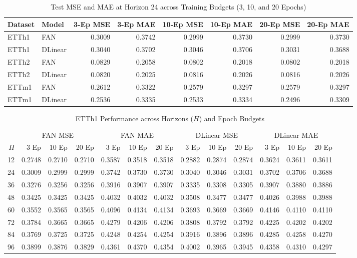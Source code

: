 \begin{table}[t]
\caption{Test MSE and MAE at Horizon 24 across Training Budgets (3, 10, and 20 Epochs)}
\label{tab:extension_h24}
\centering
\footnotesize
\begin{tabular}{@{}llrrrrrr@{}}
\toprule
Dataset & Model & 3-Ep MSE & 3-Ep MAE & 10-Ep MSE & 10-Ep MAE & 20-Ep MSE & 20-Ep MAE\\
\midrule
ETTh1 & FAN & 0.3009 & 0.3742 & 0.2999 & 0.3730 & 0.2999 & 0.3730\\
ETTh1 & DLinear & 0.3040 & 0.3702 & 0.3046 & 0.3706 & 0.3031 & 0.3688\\
\midrule
ETTh2 & FAN & 0.0829 & 0.2058 & 0.0802 & 0.2018 & 0.0802 & 0.2018\\
ETTh2 & DLinear & 0.0820 & 0.2025 & 0.0816 & 0.2026 & 0.0816 & 0.2026\\
\midrule
ETTm1 & FAN & 0.2612 & 0.3322 & 0.2579 & 0.3297 & 0.2579 & 0.3297\\
ETTm1 & DLinear & 0.2536 & 0.3335 & 0.2533 & 0.3334 & 0.2496 & 0.3309\\
\midrule
\bottomrule
\end{tabular}
\end{table}

\begin{table}[t]
\caption{ETTh1 Performance across Horizons ($H$) and Epoch Budgets}
\label{tab:extension_etth1}
\centering
\scriptsize
\begin{tabular}{@{}r|rrr|rrr|rrr|rrr@{}}
\toprule
 & \multicolumn{3}{c|}{FAN MSE} & \multicolumn{3}{c|}{FAN MAE} & \multicolumn{3}{c|}{DLinear MSE} & \multicolumn{3}{c}{DLinear MAE}\\
$H$ & 3 Ep & 10 Ep & 20 Ep & 3 Ep & 10 Ep & 20 Ep & 3 Ep & 10 Ep & 20 Ep & 3 Ep & 10 Ep & 20 Ep\\
\midrule
12 & 0.2748 & 0.2710 & 0.2710 & 0.3587 & 0.3518 & 0.3518 & 0.2882 & 0.2874 & 0.2874 & 0.3624 & 0.3611 & 0.3611\\
24 & 0.3009 & 0.2999 & 0.2999 & 0.3742 & 0.3730 & 0.3730 & 0.3040 & 0.3046 & 0.3031 & 0.3702 & 0.3706 & 0.3688\\
36 & 0.3276 & 0.3256 & 0.3256 & 0.3916 & 0.3907 & 0.3907 & 0.3335 & 0.3308 & 0.3305 & 0.3907 & 0.3880 & 0.3886\\
48 & 0.3425 & 0.3425 & 0.3425 & 0.4032 & 0.4032 & 0.4032 & 0.3508 & 0.3477 & 0.3477 & 0.4026 & 0.3988 & 0.3988\\
60 & 0.3552 & 0.3565 & 0.3565 & 0.4096 & 0.4134 & 0.4134 & 0.3693 & 0.3669 & 0.3669 & 0.4146 & 0.4110 & 0.4110\\
72 & 0.3784 & 0.3665 & 0.3665 & 0.4279 & 0.4206 & 0.4206 & 0.3808 & 0.3792 & 0.3792 & 0.4225 & 0.4202 & 0.4202\\
84 & 0.3769 & 0.3725 & 0.3725 & 0.4248 & 0.4254 & 0.4254 & 0.3916 & 0.3896 & 0.3896 & 0.4285 & 0.4258 & 0.4270\\
96 & 0.3899 & 0.3876 & 0.3829 & 0.4361 & 0.4370 & 0.4354 & 0.4002 & 0.3965 & 0.3945 & 0.4358 & 0.4310 & 0.4297\\
\bottomrule
\end{tabular}
\end{table}
